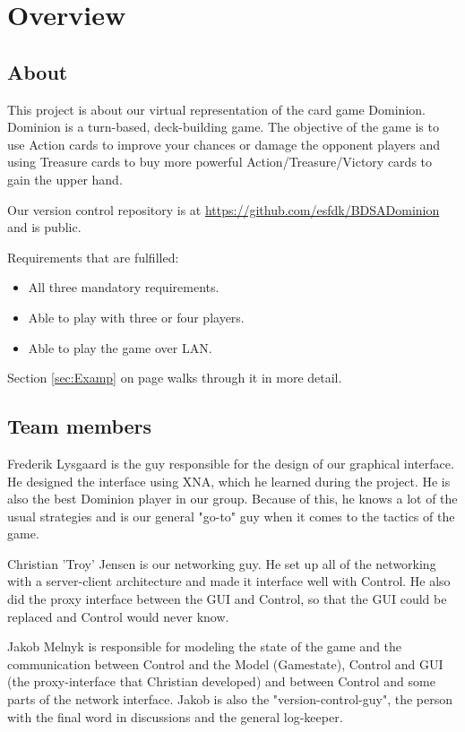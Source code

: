 \documentclass[12pt,a4paper,notitlepage]{article}
\begin{document}
\section{Overview}
\subsection{About}
This project is about our virtual representation of the card game Dominion. Dominion is a turn-based, deck-building game. The objective of the game is to use Action cards to improve your chances or damage the opponent players and using Treasure cards to buy more powerful Action/Treasure/Victory cards to gain the upper hand. 

Our version control repository is at \url{https://github.com/esfdk/BDSADominion} and is public.

Requirements that are fulfilled:
\begin{itemize}
\item All three mandatory requirements.
\item Able to play with three or four players.
\item Able to play the game over LAN.
\end{itemize}
Section \ref{sec:Examp} on page \pageref{sec:Examp} walks through it in more detail.

\subsection{Team members}
Frederik Lysgaard is the guy responsible for the design of our graphical interface. He designed the interface using XNA, which he learned during the project. He is also the best Dominion player in our group. Because of this, he knows a lot of the usual strategies and is our general "go-to" guy when it comes to the tactics of the game.

Christian 'Troy' Jensen is our networking guy. He set up all of the networking with a server-client architecture and made it interface well with Control. He also did the proxy interface between the GUI and Control, so that the GUI could be replaced and Control would never know. 

Jakob Melnyk is responsible for modeling the state of the game and the communication between Control and the Model (Gamestate), Control and GUI (the proxy-interface that Christian developed) and between Control and some parts of the network interface. Jakob is also the "version-control-guy", the person with the final word in discussions and the general log-keeper.
\end{document}
